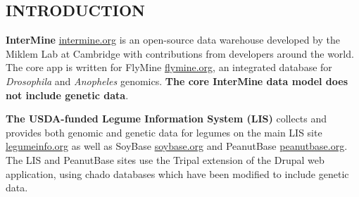 \documentclass[]{pagposter}
\begin{document}
\color{NCGRBlue}\hrulefill

\color{Black}




\begin{multicols*}{3} %

  \color{Black} %




  \section*{INTRODUCTION}

  \textbf{InterMine} \url{intermine.org} is an open-source data warehouse developed by the Miklem Lab at Cambridge with contributions from developers around the world.
  The core app is written for FlyMine \url{flymine.org}, an integrated database for \textit{Drosophila} and \textit{Anopheles} genomics.
  \textbf{The core InterMine data model does not include genetic data}.

  \textbf{The USDA-funded Legume Information System (LIS)} collects and provides both genomic and genetic data for legumes on the main LIS site \url{legumeinfo.org} as well as
  SoyBase \url{soybase.org} and PeanutBase \url{peanutbase.org}. The LIS and PeanutBase sites use the Tripal extension of the Drupal web application, using chado databases which have been
  modified to include genetic data.


\end{multicols*}
\end{document}
